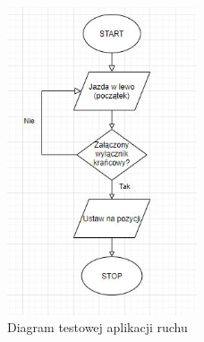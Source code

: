 \documentclass[10pt, a4paper]{article}
\begin{document}
\begin{figure}[H]
	\centering
	\includegraphics[width=0.5\textwidth]{figures/diagram.png}
	\caption{Diagram testowej aplikacji ruchu}
	\label{fig:Diagram}
\end{figure}

%
%
%
%



\end{document}
